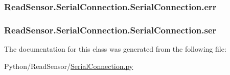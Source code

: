 \subsubsection[{\texorpdfstring{err}{err}}]{\setlength{\rightskip}{0pt plus 5cm}Read\+Sensor.\+Serial\+Connection.\+Serial\+Connection.\+err}\hypertarget{classReadSensor_1_1SerialConnection_1_1SerialConnection_a7942e305c2383cdbae17b3303f7dfe7a}{}\label{classReadSensor_1_1SerialConnection_1_1SerialConnection_a7942e305c2383cdbae17b3303f7dfe7a}
\subsubsection[{\texorpdfstring{ser}{ser}}]{\setlength{\rightskip}{0pt plus 5cm}Read\+Sensor.\+Serial\+Connection.\+Serial\+Connection.\+ser}\hypertarget{classReadSensor_1_1SerialConnection_1_1SerialConnection_a1e2d24c2fd693a56797a611a33cecd67}{}\label{classReadSensor_1_1SerialConnection_1_1SerialConnection_a1e2d24c2fd693a56797a611a33cecd67}


The documentation for this class was generated from the following file\+:\begin{DoxyCompactItemize}
\item 
Python/\+Read\+Sensor/\hyperlink{SerialConnection_8py}{Serial\+Connection.\+py}\end{DoxyCompactItemize}
